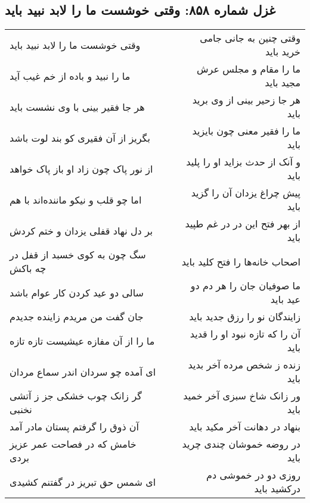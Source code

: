 \begin{center}
\section*{غزل شماره ۸۵۸: وقتی خوشست ما را لابد نبید باید}
\label{sec:0858}
\begin{longtable}{l p{0.5cm} r}
وقتی خوشست ما را لابد نبید باید
&&
وقتی چنین به جانی جامی خرید باید
\\
ما را نبید و باده از خم غیب آید
&&
ما را مقام و مجلس عرش مجید باید
\\
هر جا فقیر بینی با وی نشست باید
&&
هر جا زحیر بینی از وی برید باید
\\
بگریز از آن فقیری کو بند لوت باشد
&&
ما را فقیر معنی چون بایزید باید
\\
از نور پاک چون زاد او باز پاک خواهد
&&
و آنک از حدث بزاید او را پلید باید
\\
اما چو قلب و نیکو ماننده‌اند با هم
&&
پیش چراغ یزدان آن را گزید باید
\\
بر دل نهاد قفلی یزدان و ختم کردش
&&
از بهر فتح این در در غم طپید باید
\\
سگ چون به کوی خسبد از قفل در چه باکش
&&
اصحاب خانه‌ها را فتح کلید باید
\\
سالی دو عید کردن کار عوام باشد
&&
ما صوفیان جان را هر دم دو عید باید
\\
جان گفت من مریدم زاینده جدیدم
&&
زایندگان نو را رزق جدید باید
\\
ما را از آن مفازه عیشیست تازه تازه
&&
آن را که تازه نبود او را قدید باید
\\
ای آمده چو سردان اندر سماع مردان
&&
زنده ز شخص مرده آخر بدید باید
\\
گر زانک چوب خشکی جز ز آتشی نخنبی
&&
ور زانک شاخ سبزی آخر خمید باید
\\
آن ذوق را گرفتم پستان مادر آمد
&&
بنهاد در دهانت آخر مکید باید
\\
خامش که در فصاحت عمر عزیز بردی
&&
در روضه خموشان چندی چرید باید
\\
ای شمس حق تبریز در گفتنم کشیدی
&&
روزی دو در خموشی دم درکشید باید
\\
\end{longtable}
\end{center}
